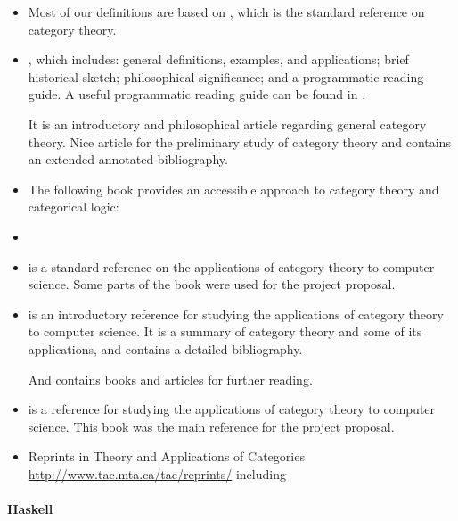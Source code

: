 \begin{itemize}
\item
  Most of our definitions are based on \parencite{maclane-1998}, which
  is the standard reference on category theory.

\item
  \parencite{marquis-2013}, which includes: general definitions,
  examples, and applications; brief historical sketch; philosophical
  significance; and a programmatic reading guide. A useful
  programmatic reading guide can be found in
  \parencite[48--56]{marquis-2013}.

  It is an introductory and philosophical article regarding general
  category theory. Nice article for the preliminary study of category
  theory and contains an extended annotated bibliography.

\item
  The following book provides an accessible approach to category
  theory and categorical logic: \parencite{awodey-2010}

\item
  \parencites{eilenberg-maclane-1942}{eilenberg-maclane-1945}

\item
  \parencite{bird-demoor-1997} is a standard reference on the
  applications of category theory to computer science. Some parts of
  the book were used for the project proposal.

\item
  \parencite{pierce-1991} is an introductory reference for studying
  the applications of category theory to computer science. It is a
  summary of category theory and some of its applications, and
  contains a detailed bibliography.

  And \parencite[§ 4]{pierce-1991} contains books and articles for
  further reading.

\item
  \parencite{poigne-1992} is a reference for studying the applications
  of category theory to computer science. This book was the main
  reference for the project proposal.

\item
  Reprints in Theory and Applications of Categories
  \url{http://www.tac.mta.ca/tac/reprints/}
  including \parencites{adamek-2006}{barr-2005}{barr-wells-2012}

\end{itemize}

\paragraph{Haskell}

